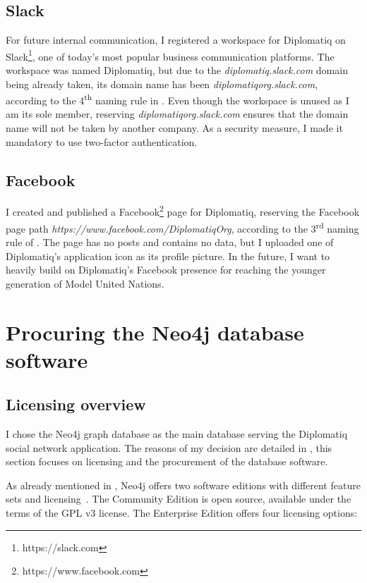 \subsection{Slack}

For future internal communication, I registered a workspace for Diplomatiq on Slack\footnote{https://slack.com}, one of today's most popular business communication platforms. The workspace was named Diplomatiq, but due to the \emph{diplomatiq.slack.com} domain being already taken, its domain name has been \emph{diplomatiqorg.slack.com}, according to the 4\textsuperscript{th} naming rule in . Even though the workspace is unused as I am its sole member, reserving \emph{diplomatiqorg.slack.com} ensures that the domain name will not be taken by another company. As a security measure, I made it mandatory to use two-factor authentication.

\subsection{Facebook}

I created and published a Facebook\footnote{https://www.facebook.com} page for Diplomatiq, reserving the Facebook page path \emph{https://www.facebook.com/DiplomatiqOrg}, according to the 3\textsuperscript{rd} naming rule of . The page has no posts and contains no data, but I uploaded one of Diplomatiq's application icon as its profile picture. In the future, I want to heavily build on Diplomatiq's Facebook presence for reaching the younger generation of Model United Nations.

\section{Procuring the Neo4j database software}

\subsection{Licensing overview}

I chose the Neo4j graph database as the main database serving the Diplomatiq social network application. The reasons of my decision are detailed in , this section focuses on licensing and the procurement of the database software.

As already mentioned in , Neo4j offers two software editions with different feature sets and licensing~\cite{neo4j-licensing}. The Community Edition is open source, available under the terms of the GPL v3 license. The Enterprise Edition offers four licensing options:

